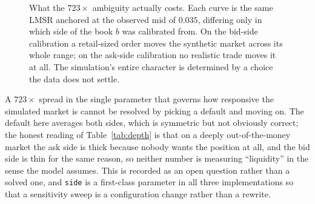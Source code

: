 \documentclass[11pt]{article}
\newcommand{\code}[1]{\texttt{\small #1}}
\begin{document}
\begin{figure}[htbp]
\centering
{}
\caption[LMSR price impact under the three calibrations of $b$]{What the $723\times$ ambiguity actually costs. Each curve is the same
LMSR anchored at the observed mid of $0.035$, differing only in which side of the
book $b$ was calibrated from. On the bid-side calibration a retail-sized order
moves the synthetic market across its whole range; on the ask-side calibration
no realistic trade moves it at all. The simulation's entire character is
determined by a choice the data does not settle.}
\label{fig:bimpact}
\end{figure}

A $723\times$ spread in the single parameter that governs how responsive the
simulated market is cannot be resolved by picking a default and moving on. The
default here averages both sides, which is symmetric but not obviously correct;
the honest reading of Table~\ref{tab:depth} is that on a deeply
out-of-the-money market the ask side is thick because nobody wants the position
at all, and the bid side is thin for the same reason, so neither number is
measuring ``liquidity'' in the sense the model assumes. This is recorded as an
open question rather than a solved one, and \code{side} is a first-class
parameter in all three implementations so that a sensitivity sweep is a
configuration change rather than a rewrite.
\end{document}

